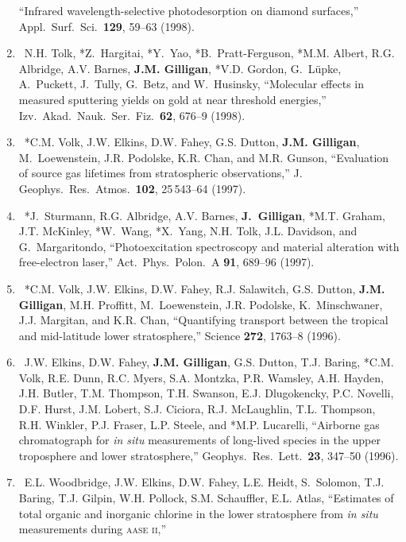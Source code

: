 \begin{enumerate}
    \enquote{Infrared wavelength-selective photodesorption on diamond surfaces,}
    Appl.\ Surf.\ Sci.\ \textbf{129}, 59--63 (1998). 
%	
    \item
    \textdagger\ 
    N.H. Tolk, *Z.~Hargitai, *Y.~Yao, *B.~Pratt-Ferguson, *M.M. Albert, R.G. Albridge, A.V. Barnes, \textbf{J.M. Gilligan}, *V.D. Gordon, G.~L\"upke, A.~Puckett, J.~Tully, G.~Betz, and W.~Husinsky, 
    \enquote{Molecular effects in measured sputtering yields on gold at near threshold energies,}  
    Izv.\ Akad.\ Nauk.\ Ser.\ Fiz.\ \textbf{62}, 676--9 (1998). 
%	
    \item
    \textdagger\ 
    *C.M. Volk, J.W. Elkins, D.W. Fahey, G.S. Dutton, \textbf{J.M. Gilligan}, M.~Loewenstein, J.R. Podolske, K.R. Chan, and M.R. Gunson, 
    \enquote{Evaluation of source gas lifetimes from stratospheric observations,}
    J. Geophys.\ Res.\ Atmos.\ \textbf{102}, 25\,543--64 (1997). 
%	
    \item
    \textdagger\ 
    *J.~Sturmann, R.G. Albridge, A.V. Barnes, \textbf{J.~Gilligan}, *M.T. Graham, J.T. McKinley, *W.~Wang, *X.~Yang, N.H. Tolk, J.L. Davidson, and G.~Margaritondo, 
    \enquote{Photoexcitation spectroscopy and material alteration with free-electron laser,}  
    Act.\ Phys.\ Polon.\ A \textbf{91}, 689--96 (1997).
%	
    \item
    \textdagger\ 
    *C.M. Volk, J.W. Elkins, D.W. Fahey, R.J. Salawitch, G.S. Dutton, \textbf{J.M. Gilligan}, M.H. Proffitt, M.~Loewenstein, J.R. Podolske, K.~Minschwaner, J.J. Margitan, and K.R. Chan, 
    \enquote{Quantifying transport between the tropical and mid-latitude lower stratosphere,}  
    Science \textbf{272}, 1763--8 (1996).
%	
    \item
    \textdagger\ 
    J.W. Elkins, D.W. Fahey, \textbf{J.M. Gilligan}, G.S. Dutton, T.J. Baring, *C.M. Volk, R.E. Dunn, R.C. Myers, S.A. Montzka, P.R. Wamsley, A.H. Hayden, J.H. Butler, T.M. Thompson, 
T.H. Swanson, E.J. Dlugokencky, P.C. Novelli, D.F. Hurst, J.M. Lobert, S.J. Ciciora, R.J. McLaughlin, T.L. Thompson, R.H. Winkler, P.J. Fraser, L.P. Steele, and *M.P. Lucarelli,
    \enquote{Airborne gas chromatograph for \emph{in situ\/} measurements of long-lived species in the upper troposphere and lower stratosphere,}  
    Geophys.\ Res.\ Lett.\ \textbf{23}, 347--50 (1996). 
%	
    \item
    \textdagger\ 
    E.L. Woodbridge, J.W. Elkins, D.W. Fahey, L.E. Heidt, S.~Solomon, T.J. Baring, T.J. Gilpin, W.H. Pollock, S.M. Schauffler, E.L. Atlas,
    \enquote{Estimates of total organic and inorganic chlorine in the lower stratosphere from \emph{in situ\/} measurements during \textsc{aase ii},}  

\end{enumerate}
